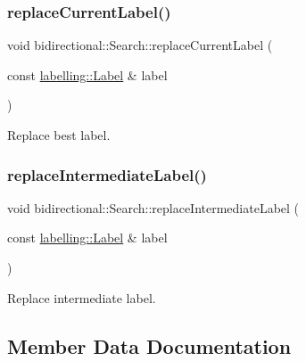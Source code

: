 \subsubsection{\texorpdfstring{replace\+Current\+Label()}{replaceCurrentLabel()}}
{\footnotesize\ttfamily void bidirectional\+::\+Search\+::replace\+Current\+Label (\begin{DoxyParamCaption}\item[{const \hyperlink{classlabelling_1_1Label}{labelling\+::\+Label} \&}]{label }\end{DoxyParamCaption})\hspace{0.3cm}{\ttfamily [inline]}}



Replace best label. 

\mbox{\label{classbidirectional_1_1Search_a66b5168d25b5fe7f673f6d335ae716d1}} 
\subsubsection{\texorpdfstring{replace\+Intermediate\+Label()}{replaceIntermediateLabel()}}
{\footnotesize\ttfamily void bidirectional\+::\+Search\+::replace\+Intermediate\+Label (\begin{DoxyParamCaption}\item[{const \hyperlink{classlabelling_1_1Label}{labelling\+::\+Label} \&}]{label }\end{DoxyParamCaption})\hspace{0.3cm}{\ttfamily [inline]}}



Replace intermediate label. 



\subsection{Member Data Documentation}
\mbox{\label{classbidirectional_1_1Search_a4b87b9c1f546b3138cb1bba0cc309a80}} 
